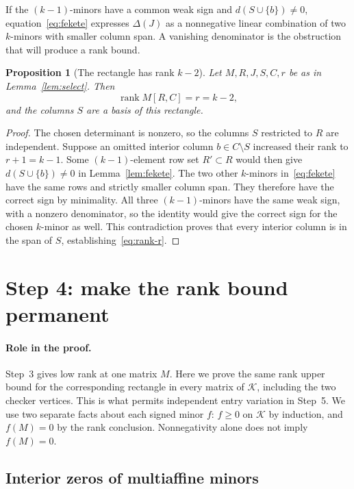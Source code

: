 \documentclass[10pt,a4paper]{article}
\newtheorem{proposition}[theorem]{Proposition}
\theoremstyle{definition}
\theoremstyle{remark}
\numberwithin{equation}{section}
\newcommand{\K}{\mathcal K}
\DeclareMathOperator{\rank}{rank}
\begin{document}
If the $(k-1)$-minors have a common weak sign and
$d(S\cup\{b\})\neq0$, equation~\eqref{eq:fekete} expresses
$\Delta(J)$ as a nonnegative linear combination of two $k$-minors
with smaller column span. A vanishing denominator is the obstruction
that will produce a rank bound.


\begin{proposition}[The rectangle has rank $k-2$]\label{lem:rectangle}
Let $M,R,J,S,C,r$ be as in Lemma~\ref{lem:select}. Then
\begin{equation}\label{eq:rank-r}
 \rank M[R,C]=r=k-2,
\end{equation}
and the columns $S$ are a basis of this rectangle.
\end{proposition}

\begin{proof}
The chosen determinant is nonzero, so the columns $S$ restricted to $R$
are independent. Suppose an omitted interior column $b\in C\setminus S$
increased their rank to $r+1=k-1$. Some $(k-1)$-element row set
$R'\subset R$ would then give $d(S\cup\{b\})\neq0$ in
Lemma~\ref{lem:fekete}. The two other $k$-minors in~\eqref{eq:fekete}
have the same rows and strictly smaller column span. They therefore have
the correct sign by minimality. All three $(k-1)$-minors have the same
weak sign, with a nonzero denominator, so the identity would give the
correct sign for the chosen $k$-minor as well. This contradiction proves
that every interior column is in the span of $S$,
establishing~\eqref{eq:rank-r}.
\end{proof}

\section{Step 4: make the rank bound permanent}\label{sec:permanent}

\paragraph{Role in the proof.}
Step~3 gives low rank at one matrix $M$. Here we prove the same rank
upper bound for the corresponding rectangle in every matrix of $\K$,
including the two checker vertices. This is what permits independent
entry variation in Step~5. We use two separate facts about each signed
minor $f$: $f\geq0$ on $\K$ by induction, and $f(M)=0$ by the rank
conclusion. Nonnegativity alone does not imply $f(M)=0$.

\subsection{Interior zeros of multiaffine minors}
\end{document}

